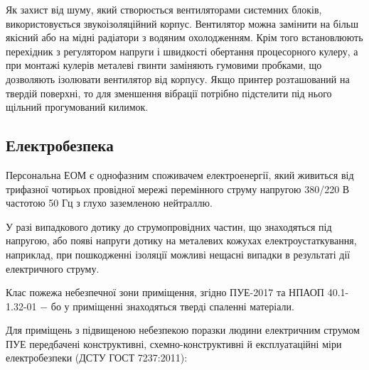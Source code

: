 Як захист від шуму, який створюється вентиляторами системних блоків, використовується звукоізоляційний корпус. Вентилятор можна замінити на більш якісний або на мідні радіатори з водяним охолодженням. Крім того встановлюють перехідник з регулятором напруги і швидкості обертання процесорного кулеру, а при монтажі кулерів металеві гвинти заміняють гумовими пробками, що дозволяють ізолювати вентилятор від корпусу. Якщо принтер розташований на твердій поверхні, то для зменшення вібрації потрібно підстелити під нього щільний прогумований килимок.

\subsection{Електробезпека}

Персональна ЕОМ є однофазним споживачем електроенергії, який живиться від трифазної чотирьох провідної мережі перемінного струму напругою 380/220 В частотою 50 Гц з глухо заземленою нейтраллю.

У разі випадкового дотику до струмопровідних частин, що знаходяться під напругою, або появі напруги дотику на металевих кожухах електроустаткування, наприклад, при пошкодженні ізоляції можливі нещасні випадки в результаті дії електричного струму.

Клас пожежа небезпечної зони приміщення, згідно ПУЕ-2017 та НПАОП 40.1-1.32-01 $-$ бо у приміщенні знаходяться тверді спаленні матеріали. 

Для приміщень з підвищеною небезпекою поразки людини електричним струмом ПУЕ передбачені конструктивні, схемно-конструктивні й експлуатаційні міри електробезпеки (ДСТУ ГОСТ 7237:2011):

